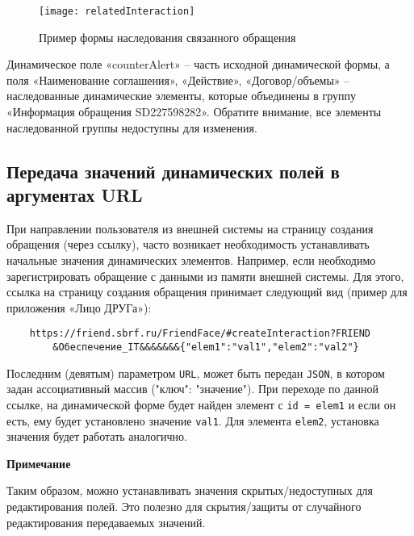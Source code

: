 \documentclass[../index.tex]{subfiles}
\begin{document}
\begin{figure}[h]
    \texttt{[image: relatedInteraction]}
    \centering
    \caption{Пример формы наследования связанного обращения}
\end{figure}

Динамическое поле «counterAlert» – часть исходной динамической формы,
а поля «Наименование соглашения», «Действие», «Договор/объемы» – наследованные динамические элементы,
которые объединены в группу «Информация обращения SD227598282».
Обратите внимание, все элементы наследованной группы недоступны для изменения.

\subsection{Передача значений динамических полей в аргументах URL}
При направлении пользователя из внешней системы на страницу создания обращения (через ссылку),
часто возникает необходимость устанавливать начальные значения динамических элементов.
Например, если необходимо зарегистрировать обращение с данными из памяти внешней системы.
Для этого, ссылка на страницу создания обращения принимает следующий вид (пример для приложения «Лицо ДРУГа»):


\begin{verbatim}
    https://friend.sbrf.ru/FriendFace/#createInteraction?FRIEND
        &Обеспечение_IT&&&&&&&{"elem1":"val1","elem2":"val2"}
\end{verbatim}


Последним (девятым) параметром \verb|URL|, может быть передан \verb|JSON|,
в котором задан ассоциативный массив ("ключ": "значение").
При переходе по данной ссылке, на динамической форме будет найден элемент с \verb|id = elem1|
и если он есть, ему будет установлено значение \verb|val1|.
Для элемента \verb|elem2|, установка значения будет работать аналогично.


\vspace{5mm}
\textbf{Примечание}


Таким образом, можно устанавливать значения скрытых/недоступных для редактирования полей.
Это полезно для скрытия/защиты от случайного редактирования передаваемых значений.
\end{document}
